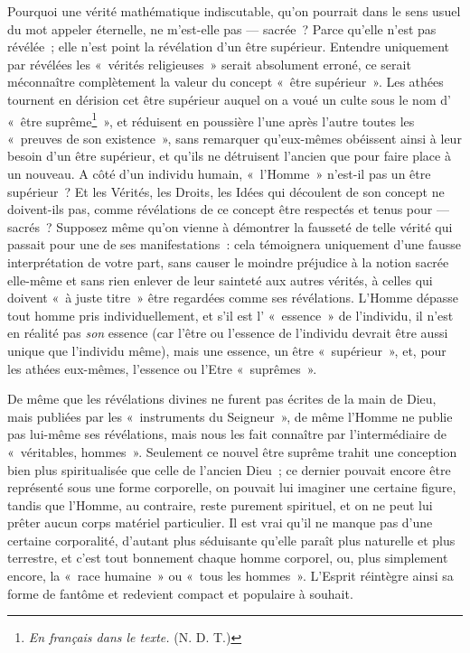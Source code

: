 \documentclass[french,twoside]{book} %
\begin{document}
Pourquoi une vérité mathématique indiscutable, qu’on pourrait dans le sens usuel du mot appeler éternelle, ne m’est-elle pas — sacrée ? Parce qu’elle n’est pas révélée ; elle n’est point la révélation d’un  être supérieur. Entendre uniquement par révélées les « vérités religieuses » serait absolument erroné, ce serait méconnaître complètement la valeur du concept « être supérieur ». Les athées tournent en dérision cet être supérieur auquel on a voué un culte sous le nom d’ « être suprême\footnote{ \noindent \emph{En français dans le texte.} (N. D. T.)
 } », et réduisent en poussière l’une après l’autre toutes les « preuves de son existence », sans remarquer qu’eux-mêmes obéissent ainsi à leur besoin d’un être supérieur, et qu’ils ne détruisent l’ancien que pour faire place à un nouveau. A côté d’un individu humain, « l’Homme » n’est-il pas un être supérieur ? Et les Vérités, les Droits, les Idées qui découlent de son concept ne doivent-ils pas, comme révélations de ce concept être respectés et tenus pour — sacrés ? Supposez même qu’on vienne à démontrer la fausseté de telle vérité qui passait pour une de ses manifestations : cela témoignera uniquement d’une fausse interprétation de votre part, sans causer le moindre préjudice à la notion sacrée elle-même et sans rien enlever de leur sainteté aux autres vérités, à celles qui doivent « à juste titre » être regardées comme ses révélations. L’Homme dépasse tout homme pris individuellement, et s’il est l’ « essence » de l’individu, il n’est en réalité pas \emph{son} essence (car l’être ou l’essence de l’individu devrait être aussi unique que l’individu même), mais une essence, un être « supérieur », et, pour les athées eux-mêmes, l’essence ou l’Etre « suprêmes ».\par
De même que les révélations divines ne furent pas écrites de la main de Dieu, mais publiées par les « instruments du Seigneur », de même l’Homme ne publie pas lui-même ses révélations, mais nous les fait connaître par l’intermédiaire de « véritables, hommes ». Seulement ce nouvel être suprême trahit une conception bien plus spiritualisée que celle de l’ancien Dieu ; ce dernier pouvait encore être représenté  sous une forme corporelle, on pouvait lui imaginer une certaine figure, tandis que l’Homme, au contraire, reste purement spirituel, et on ne peut lui prêter aucun corps matériel particulier. Il est vrai qu’il ne manque pas d’une certaine corporalité, d’autant plus séduisante qu’elle paraît plus naturelle et plus terrestre, et c’est tout bonnement chaque homme corporel, ou, plus simplement encore, la « race humaine » ou « tous les hommes ». L’Esprit réintègre ainsi sa forme de fantôme et redevient compact et populaire à souhait.\par
\end{document}
